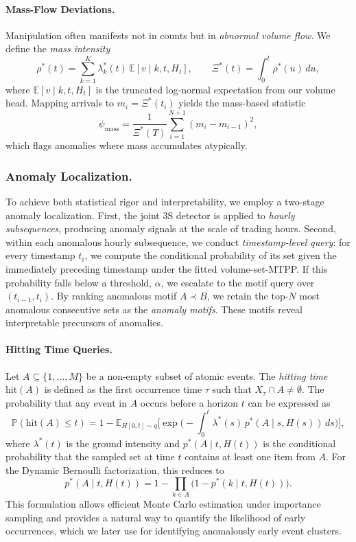 \paragraph{Mass-Flow Deviations.}
Manipulation often manifests not in counts but in \emph{abnormal volume flow}. 
We define the \emph{mass intensity}
\[
\rho^*(t) = \sum_{k=1}^K \lambda_k^*(t)\,\mathbb{E}[v \mid k,t,H_t], 
\qquad 
\Xi^*(t)=\int_0^t \rho^*(u)\,du,
\]
where $\mathbb{E}[v \mid k,t,H_t]$ is the truncated log-normal expectation from our volume head. 
Mapping arrivals to $m_i=\Xi^*(t_i)$ yields the mass-based statistic
\[
\psi_{\text{mass}} = \frac{1}{\Xi^*(T)} \sum_{i=1}^{N+1} (m_i-m_{i-1})^2,
\]
which flags anomalies where mass accumulates atypically.

\subsubsection{Anomaly Localization.}
To achieve both statistical rigor and interpretability, we employ a two-stage anomaly localization.  
First, the joint 3S detector is applied to \emph{hourly subsequences}, producing anomaly signals at the scale of trading hours.  
Second, within each anomalous hourly subsequence, we conduct \emph{timestamp-level query}: for every timestamp $t_i$, we compute the conditional probability of its set given the immediately preceding timestamp under the fitted volume-set-MTPP. If this probability falls below a threshold, $\alpha$, we escalate to the motif query over $(t_{i-1}, t_i)$. By ranking anomalous motif $A\prec B$, we retain the top-$N$ most anomalous consecutive sets as the \emph{anomaly motifs}. These motifs reveal interpretable precursors of anomalies.


\paragraph{Hitting Time Queries.}
Let $A \subseteq \{1, \dots, M\}$ be a non-empty subset of atomic events. 
The \emph{hitting time} $\text{hit}(A)$ is defined as the first occurrence time $\tau$ such that $X_\tau \cap A \neq \emptyset$. 
The probability that any event in $A$ occurs before a horizon $t$ can be expressed as
\[
\mathbb{P}(\text{hit}(A) \leq t) 
= 1 - \mathbb{E}_{H[0,t] \sim q} 
\Bigg[\exp\!\Big(-\int_0^t 
\lambda^{*}(s)\,p^{*}(A \mid s,H(s)) \, ds \Big)\Bigg],
\]
where $\lambda^{*}(t)$ is the ground intensity and $p^{*}(A \mid t,H(t))$ is the conditional probability that the sampled set at time $t$ contains at least one item from $A$. 
For the Dynamic Bernoulli factorization, this reduces to
\[
p^{*}(A \mid t,H(t)) 
= 1 - \prod_{k \in A} \big(1 - p^{*}(k \mid t,H(t))\big).
\]
This formulation allows efficient Monte Carlo estimation under importance sampling and provides a natural way to quantify the likelihood of early occurrences, which we later use for identifying anomalously early event clusters.

